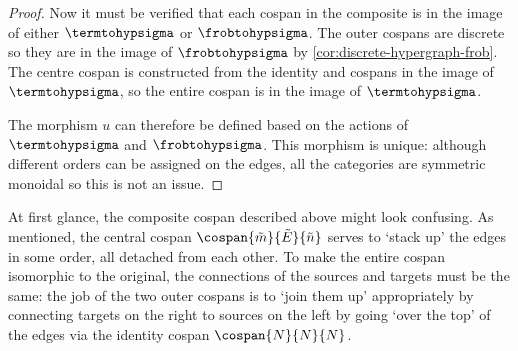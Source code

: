 \begin{proof}
    Now it must be verified that each cospan in the composite is in the image
    of either \(\termtohypsigma\) or \(\frobtohypsigma\).
    The outer cospans are discrete so they are in the image of
    \(\frobtohypsigma\) by \cref{cor:discrete-hypergraph-frob}.
    The centre cospan is constructed from the identity and cospans in the image
    of \(\termtohypsigma\), so the entire cospan is in the
    image of \(\termtohypsigma\).

    The morphism \(u\) can therefore be defined based on the actions of
    \(\termtohypsigma\) and \(\frobtohypsigma\).
    This morphism is unique: although different orders can be assigned on the
    edges, all the categories are symmetric monoidal so this is not an issue.
\end{proof}

At first glance, the composite cospan described above might look confusing.
As mentioned, the central cospan \(\cospan{\tilde{m}}{\tilde{E}}{\tilde{n}}\)
serves to `stack up' the edges in some order, all detached from each other.
To make the entire cospan isomorphic to the original, the connections of the
sources and targets must be the same: the job of the two outer cospans is to
`join them up' appropriately by connecting targets on the right to sources on
the left by going `over the top' of the edges via the identity cospan
\(\cospan{N}{N}{N}\).

